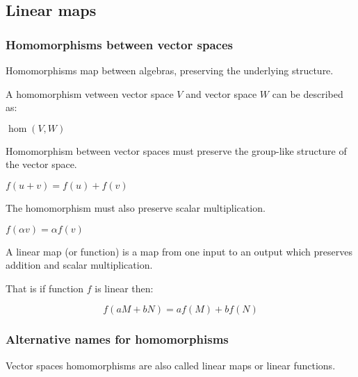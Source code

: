 
\subsection{Linear maps}

\subsubsection{Homomorphisms between vector spaces}

Homomorphisms map between algebras, preserving the underlying structure.

A homomorphism vetween vector space \(V\) and vector space \(W\) can be described as:

\(\hom (V, W)\)

Homomorphism between vector spaces must preserve the group-like structure of the vector space.

\(f(u+v)=f(u)+f(v)\)

The homomorphism must also preserve scalar multiplication.

\(f(\alpha v)=\alpha f(v)\)

A linear map (or function) is a map from one input to an output which preserves addition and scalar multiplication.

That is if function \(f\) is linear then:

$$f(aM+bN)=af(M)+bf(N)$$

\subsubsection{Alternative names for homomorphisms}

Vector spaces homomorphisms are also called linear maps or linear functions.

